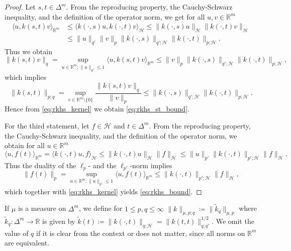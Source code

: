 \documentclass{article}
\begin{document}
\begin{proof}
  Let $s, t \in \Delta^m$. From the reproducing property, the Cauchy-Schwarz
  inequality, and the definition of the operator norm, we get for all
  $u, v \in \mathbb{R}^m$
  \begin{equation*}
    \begin{split}
      \langle u, k(s,t)v\rangle_{\mathbb{R}^m} &\leq \langle k(\cdot, s)u, k(\cdot, t)v\rangle_{\mathcal{H}} \leq \|k(\cdot,s)u\|_{\mathcal{H}} \|k(\cdot, t)v\|_{\mathcal{H}} \\
      &\leq \|u\|_{q'} \|v\|_p \|k(\cdot, s)\|_{q';\mathcal{H}} \|k(\cdot, t)\|_{p;\mathcal{H}}.
    \end{split}
  \end{equation*}
  Thus we obtain
  \begin{equation*}
    \|k(s,t)v\|_q = \sup_{u \in \mathbb{R}^m \colon \|u\|_{q'} \leq 1} \langle u, k(s,t)v \rangle_{\mathbb{R}^m} \leq \|v\|_p \|k(\cdot,s)\|_{q';\mathcal{H}} \|k(\cdot, t)\|_{p;\mathcal{H}},
  \end{equation*}
  which implies
  \begin{equation*}
    \|k(s,t)\|_{p;q} = \sup_{v \in \mathbb{R}^m \setminus \{0\}} \frac{\|k(s,t)v\|_q}{\|v\|_p} \leq \|k(\cdot,s)\|_{q';\mathcal{H}} \|k(\cdot, t)\|_{p;\mathcal{H}}.
  \end{equation*}
  Hence from \cref{eq:rkhs_kernel} we obtain \cref{eq:rkhs_st_bound}.

  For the third statement, let $f \in \mathcal{H}$ and $t \in \Delta^m$. From
  the reproducing property, the Cauchy-Schwarz inequality, and the definition of
  the operator norm, we obtain for all $u \in \mathbb{R}^m$
  \begin{equation*}
    \langle u, f(t) \rangle_{\mathbb{R}^m} = \langle k(\cdot, t) u, f \rangle_{\mathcal{H}} \leq \|k(\cdot, t) u\|_{\mathcal{H}} \|f\|_{\mathcal{H}} \leq \|u\|_{p'} \|k(\cdot, t)\|_{p';\mathcal{H}} \|f\|_{\mathcal{H}}.
  \end{equation*}
  Thus the duality of the $\ell_p$- and the $\ell_{p'}$-norm implies
  \begin{equation*}
    \|f(t)\|_p = \sup_{u \in \mathbb{R}^m \colon \|u\|_{p'} \leq 1} \langle u, f(t)\rangle_{\mathbb{R}^m} \leq \|k(\cdot, t)\|_{p';\mathcal{H}} \|f\|_{\mathcal{H}},
  \end{equation*}
  which together with \cref{eq:rkhs_kernel} yields \cref{eq:rkhs_bound}.
\end{proof}

If $\mu$ is a measure on $\Delta^m$, we define for $1 \leq p, q \leq \infty$
$\|k\|_{\mu,p;q} \coloneqq \|\tilde{k}_q\|_{\mu,p}$ where
$\tilde{k}_q \colon \Delta^m \to \mathbb{R}$ is given by
$\tilde{k}(t) \coloneqq \|k(\cdot,t)\|_{q;\mathcal{H}} = \|k(t,t)\|_{q;q'}^{1/2}$.
We omit the value of $q$ if it is clear from the context or does not matter,
since all norms on $\mathbb{R}^m$ are equivalent.
\end{document}
